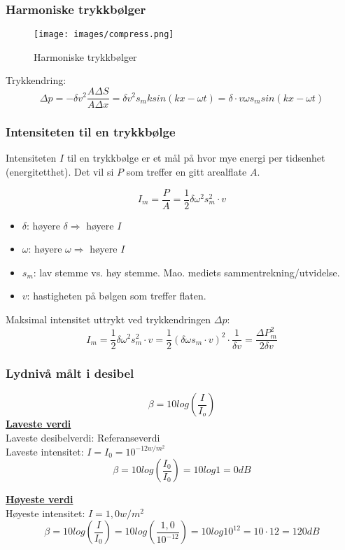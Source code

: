 \documentclass[12pt]{article}
\begin{document}
\subsubsection{Harmoniske trykkbølger}
\begin{figure} [H]
    \centering
    \texttt{[image: images/compress.png]}
    \caption{Harmoniske trykkbølger}
\end{figure}
Trykkendring:
$$\Delta p = -\delta v^2\frac{A\Delta S}{A\Delta x} = \delta v^2 s_m k sin (kx-\omega t) = \delta\cdot v\omega s_m sin(kx-\omega t)$$


\subsubsection{Intensiteten til en trykkbølge}
Intensiteten $I$ til en trykkbølge er et mål på hvor mye energi per tidsenhet (energitetthet). Det vil si $P$ som treffer en gitt arealflate $A$.

$$I_m = \frac{P}{A} = \frac{1}{2}\delta\omega^2s_m^2\cdot v$$
\begin{itemize}
    \item [] $\delta$: høyere $\delta \Rightarrow$ høyere $I$ 
    \item [] $\omega$: høyere $\omega \Rightarrow$ høyere $I$ 
    \item [] $s_m$: lav stemme vs. høy stemme. Mao. mediets sammentrekning/utvidelse. 
    \item [] $v$: hastigheten på bølgen som treffer flaten.
\end{itemize}
Maksimal intensitet uttrykt ved trykkendringen $\Delta p$:
$$I_m = \frac{1}{2}\delta\omega^2s_m^2\cdot v = \frac{1}{2}(\delta\omega s_m\cdot v)^2\cdot\frac{1}{\delta v} = \frac{\Delta P_m^2}{2\delta v}$$

\subsubsection{Lydnivå målt i desibel}
$$\beta = 10 log(\frac{I}{I_o})$$
\underline{\textbf{Laveste verdi}}\\
\bigskip
Laveste desibelverdi: Referanseverdi\\
Laveste intensitet: $I = I_0 = 10^{-12 w/m^2}$
$$\beta = 10 log(\frac{I_0}{I_0}) = 10 log 1 = 0dB$$

\underline{\textbf{Høyeste verdi}}\\
\bigskip
Høyeste intensitet: $I = 1,0 w/m^2$
$$\beta = 10 log(\frac{I}{I_0}) = 10 log(\frac{1,0}{10^{-12}}) = 10 log 10^{12} = 10\cdot 12 = 120dB$$
\end{document}
